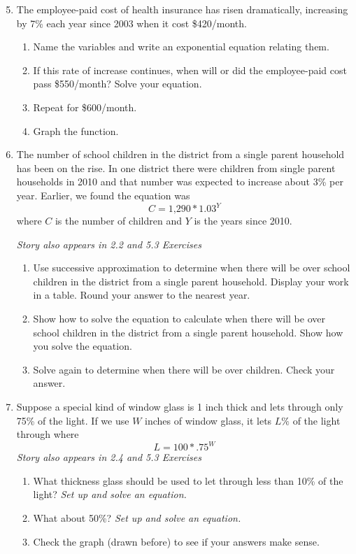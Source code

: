 \begin{enumerate} 
\setcounter{enumi}{4}

\item The employee-paid cost of health insurance has risen dramatically, increasing by 7\% each year since 2003 when it cost \$420/month.  
\begin{enumerate}
\item Name the variables and write an exponential equation relating them.
\item If this rate of increase continues, when will or did the employee-paid cost pass \$550/month?  Solve your equation.
\item Repeat for \$600/month.
\item Graph the function.  
\end{enumerate}

\item The number of school children in the district from a single parent household has been on the rise.  In one district there were  children from single parent households in 2010 and that number was expected to increase about 3\% per year.  Earlier, we found the equation was $$C = \text{1,290}\ast1.03^Y$$ where $C$ is the number of children and $Y$ is the years since 2010.

\hfill \emph{Story also appears in 2.2 and 5.3 Exercises}
\begin{enumerate}
\item Use successive approximation to determine when there will be over  school children in the district from a single parent household. Display your work in a table.  Round your answer to the nearest year.
\item Show how to solve the equation to calculate when there will be over  school children in the district from a single parent household. Show how you solve the equation.
\item Solve again to determine when there will be over  children. Check your answer.
\end{enumerate}

\item Suppose a special kind of window glass is 1 inch thick and lets through only 75\% of the light.  If we use $W$ inches of window glass, it lets $L\%$ of the light through where $$L = 100\ast .75^W$$
\hfill \emph{Story also appears in 2.4 and 5.3 Exercises}
\begin{enumerate}
\item What thickness glass should be used to let through less than 10\% of the light?  \emph{Set up and solve an equation.}
\item What about 50\%? \emph{Set up and solve an equation.}
\item Check the graph (drawn before) to see if your answers make sense.
\end{enumerate}


\end{enumerate}
